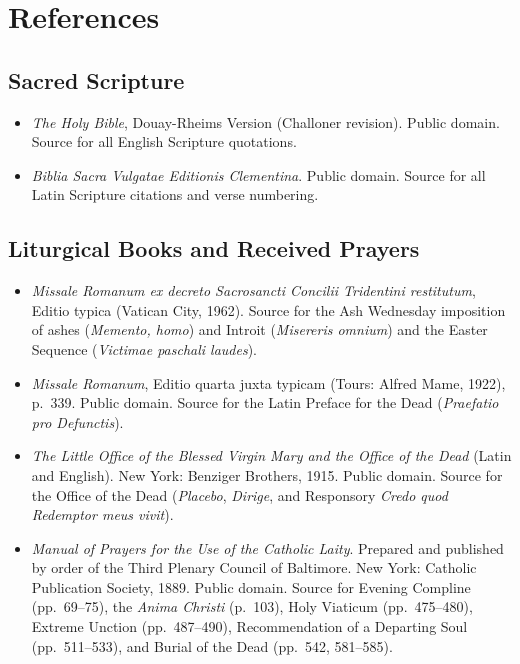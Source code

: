 \section{References}

\begingroup
\small
\ifdefined\TriptychPrintEdition
{}
\else
\fi
\subsection*{Sacred Scripture}

\begin{itemize}
\item \textit{The Holy Bible}, Douay-Rheims Version (Challoner revision). Public domain. Source for all English Scripture quotations.
\item \textit{Biblia Sacra Vulgatae Editionis Clementina}. Public domain. Source for all Latin Scripture citations and verse numbering.
\end{itemize}

\subsection*{Liturgical Books and Received Prayers}

\begin{itemize}
\item \textit{Missale Romanum ex decreto Sacrosancti Concilii Tridentini restitutum}, Editio typica (Vatican City, 1962). Source for the Ash Wednesday imposition of ashes (\textit{Memento, homo}) and Introit (\textit{Misereris omnium}) and the Easter Sequence (\textit{Victimae paschali laudes}).
\item \textit{Missale Romanum}, Editio quarta juxta typicam (Tours: Alfred Mame, 1922), p.\ 339. Public domain. Source for the Latin Preface for the Dead (\textit{Praefatio pro Defunctis}).
\item \textit{The Little Office of the Blessed Virgin Mary and the Office of the Dead} (Latin and English). New York: Benziger Brothers, 1915. Public domain. Source for the Office of the Dead (\textit{Placebo}, \textit{Dirige}, and Responsory \textit{Credo quod Redemptor meus vivit}).
\item \textit{Manual of Prayers for the Use of the Catholic Laity}. Prepared and published by order of the Third Plenary Council of Baltimore. New York: Catholic Publication Society, 1889. Public domain. Source for Evening Compline (pp.\ 69--75), the \textit{Anima Christi} (p.\ 103), Holy Viaticum (pp.\ 475--480), Extreme Unction (pp.\ 487--490), Recommendation of a Departing Soul (pp.\ 511--533), and Burial of the Dead (pp.\ 542, 581--585).
\end{itemize}

